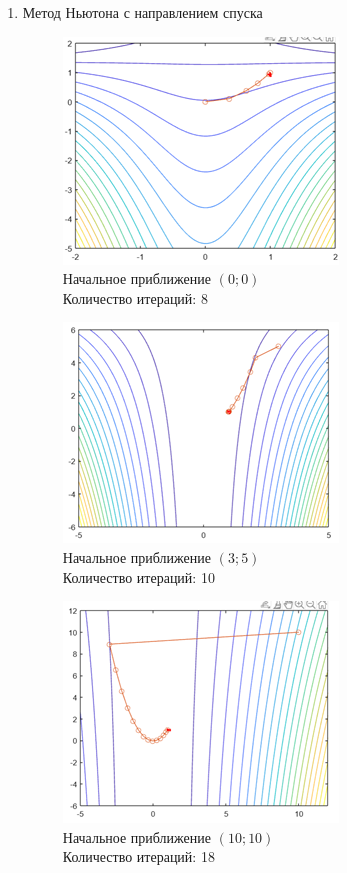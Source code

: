 \documentclass[12pt]{article}
\begin{document}
\begin{enumerate}
\begin{enumerate}
	\item Метод Ньютона с направлением спуска

	\begin{figure}[H]
	\begin{minipage}{.5\textwidth}
    	\centering
    	\includegraphics[]{img/f5_3_1.png}
    	\\ Начальное приближение $\left( 0; 0 \right)$
    	\\ Количество итераций: 8
	\end{minipage}
	\begin{minipage}{.5\textwidth}
    	\centering
    	\includegraphics[]{img/f5_3_2.png}
    	\\ Начальное приближение $\left( 3; 5 \right)$
    	\\ Количество итераций: 10
	\end{minipage}
    \end{figure}

	\begin{figure}[H]
    	\centering
    	\includegraphics[]{img/f5_3_3.png}
    	\\ Начальное приближение $\left( 10; 10 \right)$
    	\\ Количество итераций: 18
    \end{figure}


\end{enumerate}
\end{enumerate}
\end{document}
